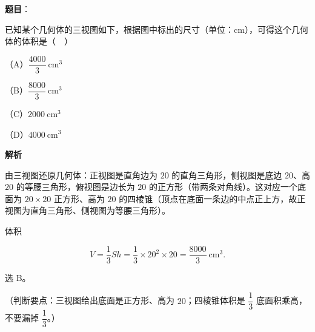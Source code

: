 \begin{answer}

\textbf{题目}：

已知某个几何体的三视图如下，根据图中标出的尺寸（单位：$\mathrm{cm}$），可得这个几何体的体积是（　）
\nopagebreak[4]
\begin{center}\end{center}
\nopagebreak[4]
（A）$\dfrac{4000}{3}\ \mathrm{cm^3}$

（B）$\dfrac{8000}{3}\ \mathrm{cm^3}$

（C）$2000\ \mathrm{cm^3}$

（D）$4000\ \mathrm{cm^3}$

\textbf{解析}

由三视图还原几何体：正视图是直角边为 $20$ 的直角三角形，侧视图是底边 $20$、高 $20$ 的等腰三角形，俯视图是边长为 $20$ 的正方形（带两条对角线）。这对应一个底面为 $20\times20$ 正方形、高为 $20$ 的四棱锥（顶点在底面一条边的中点正上方，故正视图为直角三角形、侧视图为等腰三角形）。

体积

\nopagebreak[4]
\[V=\frac13Sh=\frac13\times20^2\times20=\frac{8000}{3}\ \mathrm{cm^3}.\]

选 B。

（判断要点：三视图给出底面是正方形、高为 $20$；四棱锥体积是 $\dfrac13$ 底面积乘高，不要漏掉 $\dfrac13$。）


\end{answer}
